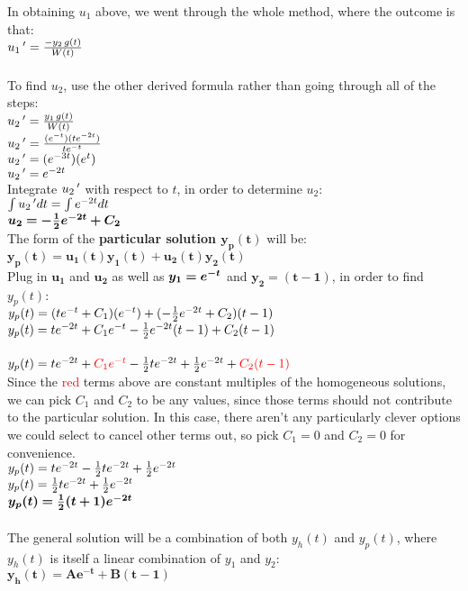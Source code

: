 \documentclass{article}
\begin{document}
\begin{enumerate}
\begin{enumerate}
\newpage
In obtaining $u_1$ above, we went through the whole method, where the outcome is that:\\$u_1\,\sp{\prime} = {-y_2\,{g(t)}\over W(t)}$\\\\
To find $u_2$, use the other derived formula rather than going through all of the steps:\\
$u_2\,\sp{\prime} = {y_1\,{g(t)}\over W(t)}$\\
$u_2\,\sp{\prime} = {(e^{-t})(te^{-2t})\over te\sp{-t}}$\\
$u_2\,\sp{\prime} = (e^{-3t})(e^{t})$\\
$u_2\,\sp{\prime} = e^{-2t}$\\

Integrate $u_2\,\sp{\prime}$ with respect to $t$, in order to determine $u_2$:\\
$\int{u_2\,\sp{\prime}dt} = \int{e^{-2t}dt}$\\
$\bm{u_2 = -{1 \over 2}e^{-2t} + C_2}$\\

The form of the \textbf{particular solution $\bm{y_p(t)}$} will be:\\
$\bm{y_p(t) = u_1(t)y_1(t) + u_2(t)y_2(t)}$\\
Plug in $\bm{u_1}$ and $\bm{u_2}$ as well as $\bm{y_1 = e\sp{-t}}$ and $\bm{y_2 = (t-1)}$, in order to find $y_p(t)$:\\
$y_p(t) = (te^{-t} + C_1)(e\sp{-t}) + (-{1 \over 2}e^{-2t} + C_2)(t-1)$\\
$y_p(t) = te^{-2t} + C_1e\sp{-t} - {1 \over 2}e^{-2t}(t-1) + C_2(t-1)$\\\\
$y_p(t) = te^{-2t} + \textcolor{red}{C_1e\sp{-t}} - {1 \over 2}te^{-2t} + {1 \over 2}e^{-2t} + \textcolor{red}{C_2(t-1)}$\\
Since the \textcolor{red}{red} terms above are constant multiples of the homogeneous solutions, we can pick $C_1$ and $C_2$ to be any values, since those terms should not contribute to the particular solution. In this case, there aren't any particularly clever options we could select to cancel other terms out, so pick $C_1 = 0$ and $C_2 = 0$ for convenience.\\
$y_p(t) = te^{-2t} - {1 \over 2}te^{-2t} + {1 \over 2}e^{-2t}$\\
$y_p(t) = {1 \over 2}te^{-2t} + {1 \over 2}e^{-2t}$\\
$\bm{y_p(t) = {1\over2}(t+1)e^{-2t}}$\\\\
The general solution will be a combination of both $y_h(t)$ and $y_p(t)$, where $y_h(t)$ is itself a linear combination of $y_1$ and $y_2$:\\
$\bm{y_h(t) = A{e^{-t}} + B(t-1)}$\\


\end{enumerate}
\end{enumerate}
\end{document}
